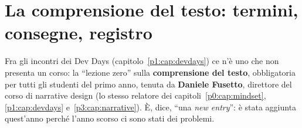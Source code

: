 %

\chapter[La comprensione del testo]{La comprensione del testo: termini,
consegne, registro}
\label{pt:cap:comprensione}

Fra gli incontri dei Dev Days (capitolo~\ref{p1:cap:devdays}) ce n'è uno
che non presenta un corso: la ``lezione zero'' sulla \textbf{comprensione
del testo}, obbligatoria per tutti gli studenti del primo anno, tenuta da
\textbf{Daniele Fusetto}, direttore del corso di narrative design (lo stesso
relatore dei capitoli~\ref{p0:cap:mindset}, \ref{p1:cap:devdays}
e~\ref{p3:cap:narrative}). È, dice, ``una \emph{new entry}'': è stata aggiunta
quest'anno perché l'anno scorso ci sono stati dei problemi.

